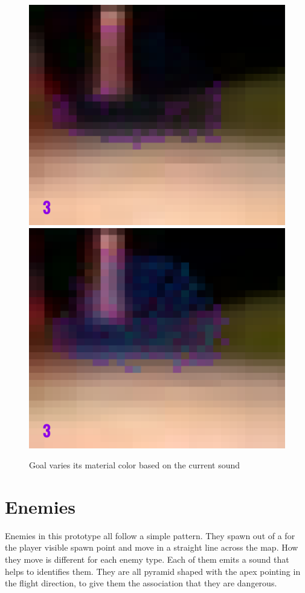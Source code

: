 \begin{figure}[p]
  \centering
  \includegraphics[width=\imgWidth]{images/game_systems/GoalDim.png} \\[\picVdist]
  \includegraphics[width=\imgWidth]{images/game_systems/GoalBright.png}
  \caption{Goal varies its material color based on the current sound}
  \label{GoalBlinks}
\end{figure}


\section{Enemies}
Enemies in this prototype all follow a simple pattern. They spawn out of a for the player visible spawn point and move in a straight line across the map. How they move is different for each enemy type. Each of them emits a sound that helps to identifies them. They are all pyramid shaped with the apex pointing in the flight direction, to give them the association that they are dangerous.


